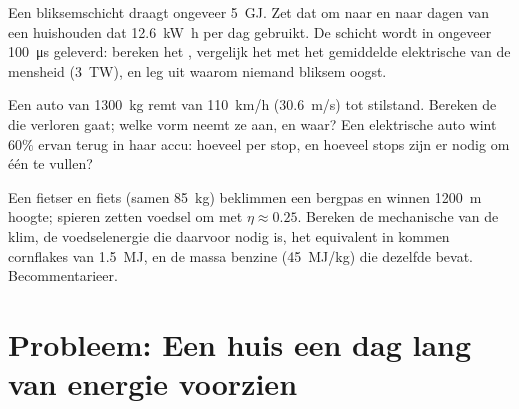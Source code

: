 \begin{exercise}[$\star\star\star$]\label{exo:g10:energy-conservation:13}
Een bliksemschicht draagt ongeveer \qty{5}{GJ}. Zet dat om naar
 en naar dagen van een huishouden dat \qty{12.6}{kW.h} per dag
gebruikt. De schicht wordt in ongeveer \qty{100}{\micro s} geleverd:
bereken het , vergelijk het met het gemiddelde elektrische
 van de mensheid (\qty{3}{TW}), en leg uit waarom niemand
bliksem oogst.
\end{exercise}

\begin{exercise}[$\star\star\star$]\label{exo:g10:energy-conservation:14}
Een auto van \qty{1300}{kg} remt van \qty{110}{km/h} (\qty{30.6}{m/s})
tot stilstand. Bereken de  die verloren gaat; welke
vorm neemt ze aan, en waar? Een elektrische auto wint $60\%$ ervan terug
in haar accu: hoeveel  per stop, en hoeveel stops zijn er nodig om
één  te vullen?
\end{exercise}

\begin{exercise}[$\star\star\star$]\label{exo:g10:energy-conservation:15}
Een fietser en fiets (samen \qty{85}{kg}) beklimmen een bergpas en winnen
\qty{1200}{m} hoogte; spieren zetten voedsel om met $\eta \approx 0.25$.
Bereken de mechanische  van de klim, de voedselenergie die
daarvoor nodig is, het equivalent in kommen cornflakes van \qty{1.5}{MJ},
en de massa benzine (\qty{45}{MJ/kg}) die dezelfde  bevat.
Becommentarieer.
\end{exercise}

\section{Probleem: Een huis een dag lang van energie voorzien}

